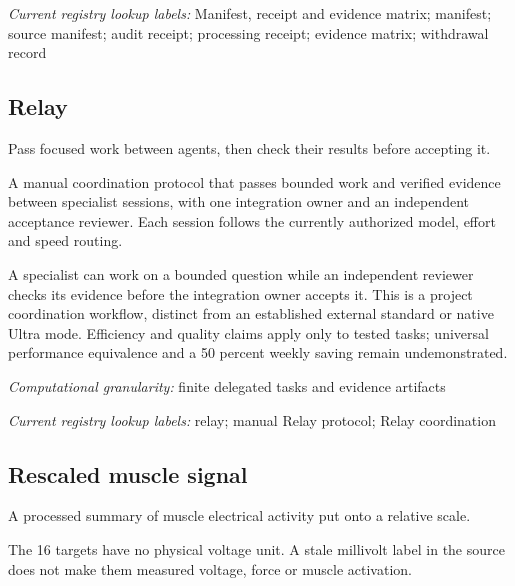 \noindent\textit{Current registry lookup labels:} Manifest, receipt and evidence matrix; manifest; source manifest; audit receipt; processing receipt; evidence matrix; withdrawal record\par

\begin{samepage}
\subsection*{Relay}
\noindent Pass focused work between agents, then check their results before accepting it.\par
\end{samepage}
\noindent A manual coordination protocol that passes bounded work and verified evidence between specialist sessions, with one integration owner and an independent acceptance reviewer. Each session follows the currently authorized model, effort and speed routing.\par
\noindent A specialist can work on a bounded question while an independent reviewer checks its evidence before the integration owner accepts it. This is a project coordination workflow, distinct from an established external standard or native Ultra mode. Efficiency and quality claims apply only to tested tasks; universal performance equivalence and a 50 percent weekly saving remain undemonstrated.\par
\begin{samepage}
\noindent\textit{Computational granularity:} finite delegated tasks and evidence artifacts\par\nopagebreak[4]

\end{samepage}


\noindent\textit{Current registry lookup labels:} relay; manual Relay protocol; Relay coordination\par

\begin{samepage}
\subsection*{Rescaled muscle signal}
\noindent A processed summary of muscle electrical activity put onto a relative scale.\par
\end{samepage}
\begin{samepage}
\noindent The 16 targets have no physical voltage unit. A stale millivolt label in the source does not make them measured voltage, force or muscle activation.\par\nopagebreak[4]

\end{samepage}


